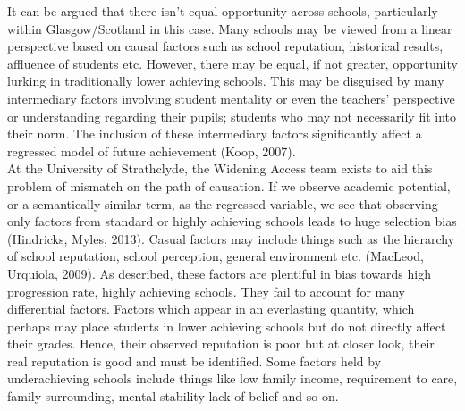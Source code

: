 \documentclass[11pt, english]{article}
\begin{document}
	It can be argued that there isn’t equal opportunity across schools, particularly within Glasgow/Scotland in this case. Many schools may be viewed from a linear perspective based on causal factors such as school reputation, historical results, affluence of students etc. However, there may be equal, if not greater, opportunity lurking in traditionally lower achieving schools. This may be disguised by many intermediary factors involving student mentality or even the teachers’ perspective or understanding regarding  their pupils; students who may not necessarily fit into their norm. The inclusion of these intermediary factors significantly affect a regressed model of future achievement (Koop, 2007).\\

	At the University of Strathclyde, the Widening Access team exists to aid this problem of mismatch on the path of causation. If we observe academic potential, or a semantically similar term, as the regressed variable, we see that observing only factors from standard or highly achieving schools leads to huge selection bias (Hindricks, Myles, 2013). Casual factors may include things such as the hierarchy of school reputation, school perception, general environment etc. (MacLeod, Urquiola, 2009). As described, these factors are plentiful in bias towards high progression rate, highly achieving schools. They fail to account for many differential factors. Factors which appear in an everlasting quantity, which perhaps may place students in lower achieving schools but do not directly affect their grades. Hence, their observed reputation is poor but at closer look, their real reputation is good and must be identified. Some factors held by underachieving schools include things like low family income, requirement to care, family surrounding, mental stability lack of belief and so on.\\
\end{document}
